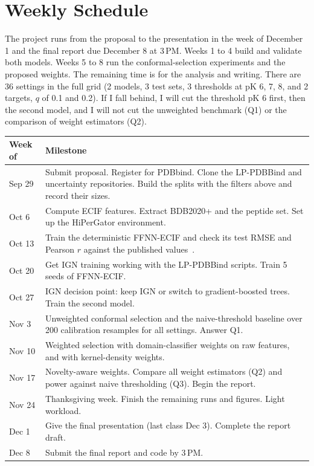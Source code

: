 \documentclass[10pt,twocolumn]{article}
\begin{document}
\section{Weekly Schedule}

The project runs from the proposal to the presentation in the week of December 1 and the final report due December 8 at 3\,PM. Weeks 1 to 4 build and validate both models. Weeks 5 to 8 run the conformal-selection experiments and the proposed weights. The remaining time is for the analysis and writing. There are 36 settings in the full grid (2 models, 3 test sets, 3 thresholds at pK 6, 7, 8, and 2 targets, $q$ of 0.1 and 0.2). If I fall behind, I will cut the threshold pK 6 first, then the second model, and I will not cut the unweighted benchmark (Q1) or the comparison of weight estimators (Q2).

\begin{center}
\footnotesize
\begin{tabular}{@{}>{\raggedright\arraybackslash}p{1.3cm}>{\raggedright\arraybackslash}p{6.6cm}@{}}
  \toprule
  Week of & Milestone \\
  \midrule
  Sep 29 & Submit proposal. Register for PDBbind. Clone the LP-PDBBind and uncertainty repositories. Build the splits with the filters above and record their sizes. \\
  Oct 6  & Compute ECIF features. Extract BDB2020+ and the peptide set. Set up the HiPerGator environment. \\
  Oct 13 & Train the deterministic FFNN-ECIF and check its test RMSE and Pearson $r$ against the published values~\cite{rayka2025}. \\
  Oct 20 & Get IGN training working with the LP-PDBBind scripts. Train 5 seeds of FFNN-ECIF. \\
  Oct 27 & IGN decision point: keep IGN or switch to gradient-boosted trees. Train the second model. \\
  Nov 3  & Unweighted conformal selection and the naive-threshold baseline over 200 calibration resamples for all settings. Answer Q1. \\
  Nov 10 & Weighted selection with domain-classifier weights on raw features, and with kernel-density weights. \\
  Nov 17 & Novelty-aware weights. Compare all weight estimators (Q2) and power against naive thresholding (Q3). Begin the report. \\
  Nov 24 & Thanksgiving week. Finish the remaining runs and figures. Light workload. \\
  Dec 1  & Give the final presentation (last class Dec 3). Complete the report draft. \\
  Dec 8  & Submit the final report and code by 3\,PM. \\
  \bottomrule
\end{tabular}
\end{center}
\end{document}

